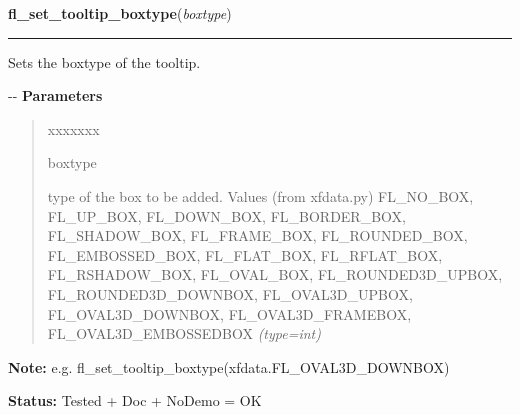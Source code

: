 \hspace{.8\funcindent}\begin{boxedminipage}{\funcwidth}

    \raggedright \textbf{fl\_set\_tooltip\_boxtype}(\textit{boxtype})

    \vspace{-1.5ex}

    \rule{\textwidth}{0.5\fboxrule}
\setlength{\parskip}{2ex}

Sets the boxtype of the tooltip.

-{}-
\setlength{\parskip}{1ex}
      \textbf{Parameters}
      \vspace{-1ex}

      \begin{quote}
        \begin{Ventry}{xxxxxxx}

          \item[boxtype]


type of the box to be added. Values (from xfdata.py) FL\_NO\_BOX,
FL\_UP\_BOX, FL\_DOWN\_BOX, FL\_BORDER\_BOX, FL\_SHADOW\_BOX, FL\_FRAME\_BOX,
FL\_ROUNDED\_BOX, FL\_EMBOSSED\_BOX, FL\_FLAT\_BOX, FL\_RFLAT\_BOX,
FL\_RSHADOW\_BOX, FL\_OVAL\_BOX, FL\_ROUNDED3D\_UPBOX, FL\_ROUNDED3D\_DOWNBOX,
FL\_OVAL3D\_UPBOX, FL\_OVAL3D\_DOWNBOX, FL\_OVAL3D\_FRAMEBOX,
FL\_OVAL3D\_EMBOSSEDBOX
            {\it (type=int)}

        \end{Ventry}

      \end{quote}

\textbf{Note:} 
e.g. fl\_set\_tooltip\_boxtype(xfdata.FL\_OVAL3D\_DOWNBOX)


\textbf{Status:} 
Tested + Doc + NoDemo = OK


    \end{boxedminipage}

    \label{xformslib:flgoodies:fl_set_tooltip_lalign}

    \vspace{0.5ex}

